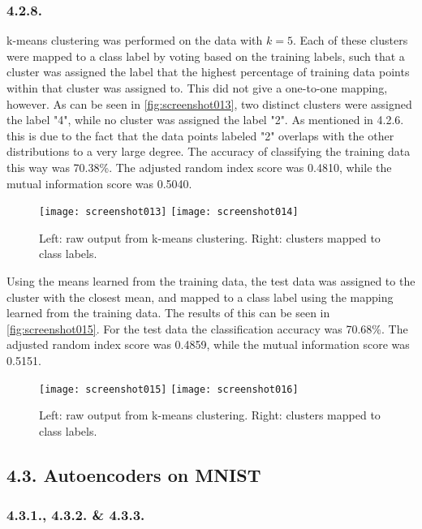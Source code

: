 \documentclass[a4paper, 12pt]{article}
\begin{document}
\subsubsection{4.2.8.}

k-means clustering was performed on the data with $k = 5$. Each of these clusters were mapped to a class label by voting based on the training labels, such that a cluster was assigned the label that the highest percentage of training data points within that cluster was assigned to. This did not give a one-to-one mapping, however. As can be seen in \autoref{fig:screenshot013}, two distinct clusters were assigned the label "4", while no cluster was assigned the label "2". As mentioned in 4.2.6. this is due to the fact that the data points labeled "2" overlaps with the other distributions to a very large degree. The accuracy of classifying the training data this way was 70.38\%. The adjusted random index score was 0.4810, while the mutual information score was 0.5040.

\begin{figure}[H]
	\centering
	\texttt{[image: screenshot013]}
	\texttt{[image: screenshot014]}
	\caption{Left: raw output from k-means clustering. Right: clusters mapped to class labels.}
	\label{fig:screenshot013}
\end{figure}

Using the means learned from the training data, the test data was assigned to the cluster with the closest mean, and mapped to a class label using the mapping learned from the training data. The results of this can be seen in \autoref{fig:screenshot015}. For the test data the classification accuracy was 70.68\%. The adjusted random index score was 0.4859, while the mutual information score was 0.5151.

\begin{figure}[H]
	\centering
	\texttt{[image: screenshot015]}
	\texttt{[image: screenshot016]}
	\caption{Left: raw output from k-means clustering. Right: clusters mapped to class labels.}
	\label{fig:screenshot015}
\end{figure}

\subsection{4.3. Autoencoders on MNIST}

\subsubsection{4.3.1., 4.3.2. \& 4.3.3.}
\end{document}
